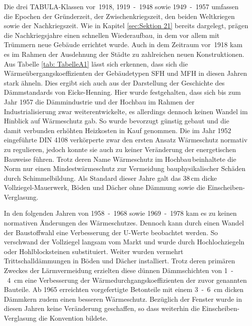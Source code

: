 Die drei TABULA-Klassen \mbox{vor 1918}, \mbox{1919 - 1948} sowie \mbox{1949 - 1957} umfassen die Epochen der Gründerzeit, der Zwischenkriegszeit, den beiden Weltkriegen sowie der Nachkriegszeit. 
Wie in Kapitel \ref{sec:Sektion 21} bereits dargelegt, prägen die Nachkriegsjahre einen schnellen Wiederaufbau, in dem vor allem mit Trümmern neue Gebäude errichtet wurde. 
Auch in dem Zeitraum \mbox{vor 1918} kam es im Rahmen der Ausdehnung der Städte zu zahlreichen neuen Konstruktionen. 
Aus Tabelle \ref{tab: TabelleA1} lässt sich erkennen, dass sich die Wärmeübergangskoeffizienten der Gebäudetypen SFH und MFH in diesen Jahren stark ähneln. 
Dies ergibt sich auch aus der Darstellung der Geschichte des Dämmstandards von Eicke-Henning. %
Hier wurde festgehalten, dass sich bis zum Jahr 1957 die Dämmindustrie und der Hochbau im Rahmen der Industrialisierung zwar weiterentwickelte, es allerdings dennoch keinen Wandel im Hinblick auf Wärmeschutz gab.
So wurde bevorzugt günstig gebaut und die damit verbunden erhöhten Heizkosten in Kauf genommen.
Die im Jahr 1952 eingeführte DIN 4108 verkörperte zwar den ersten Ansatz Wärmeschutz normativ zu regulieren, jedoch konnte sie auch zu keiner Veränderung der energetischen Bauweise führen. 
Trotz deren Name \glqq Wärmeschutz im Hochbau\grqq\,beinhaltete die Norm nur einen Mindestwärmeschutz zur Vermeidung bauphysikalischer Schäden durch Schimmelbildung.
Als Standard dieser Jahre galt das 38\,cm dicke Vollziegel-Mauerwerk, Böden und Dächer ohne Dämmung sowie die Einscheiben-Verglasung. \cite{EickeHenning.2011}

In den folgenden Jahren von \mbox{1958 - 1968} sowie \mbox{1969 - 1978} kam es zu keinen normativen Änderungen des Wärmeschutzes. 
Dennoch kann durch einen Wandel der Baustoffwahl eine Verbesserung der U-Werte beobachtet werden. 
So verschwand der Vollziegel langsam vom Markt und wurde durch Hochlochziegeln oder Hohlblocksteinen substituiert.
Weiter wurden vermehrt Trittschalldämmungen in Böden und Dächer installiert. 
Trotz deren primären Zweckes der Lärmvermeidung erzielten diese dünnen Dämmschichten von \mbox{1 - 4 cm} eine Verbesserung der Wärmedurchgangskoeffizienten der zuvor genannten Bauteile.
Ab 1965 erreichten vorgefertigte Betonteile mit einem \mbox{3 - 6 cm} dicken Dämmkern zudem einen besseren Wärmeschutz.
Bezüglich der Fenster wurde in diesen Jahren keine Veränderung geschaffen, so dass weiterhin die Einscheiben-Verglasung die Konvention bildete. \cite{EickeHenning.2011}

